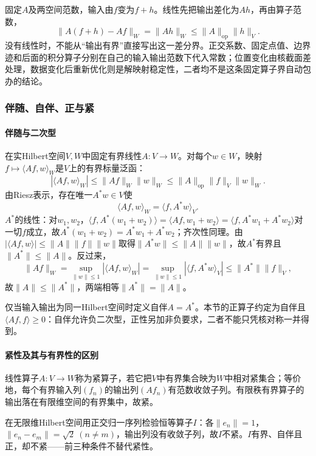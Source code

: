 固定$A$及两空间范数，输入由$f$变为$f+h$。线性先把输出差化为$Ah$，再由算子范数，
\begin{equation}
\label{eq:functional-operator-error-propagation}
\|A(f+h)-Af\|_W=\|Ah\|_W\le\|A\|_{\mathrm{op}}\|h\|_V.
\end{equation}
没有线性时，不能从“输出有界”直接写出这一差分界。正交系数、固定点值、边界迹和后面的积分算子分别在自己的输入输出范数下代入常数；位置变化由核截面差处理，数据变化后重新优化则是解映射稳定性，二者均不是这条固定算子界自动包办的结论。

\subsubsection{伴随、自伴、正与紧}
\label{subsubsec:adjoint-selfadjoint-compact}

\paragraph{伴随与二次型}

在实Hilbert空间$V,W$中固定有界线性$A:V\to W$。对每个$w\in W$，映射$f\mapsto\langle Af,w\rangle_W$是$V$上的有界标量泛函：
\[
|\langle Af,w\rangle_W|\le\|Af\|_W\|w\|_W\le\|A\|_{\mathrm{op}}\|f\|_V\|w\|_W.
\]
由Riesz表示，存在唯一$A^*w\in V$使
\[
\langle Af,w\rangle_W=\langle f,A^*w\rangle_V.
\]
$A^*$的线性：对$w_1,w_2$，$\langle f,A^*(w_1+w_2)\rangle=\langle Af,w_1+w_2\rangle=\langle f,A^*w_1+A^*w_2\rangle$对一切$f$成立，故$A^*(w_1+w_2)=A^*w_1+A^*w_2$；齐次性同理。由$|\langle Af,w\rangle|\le\|A\|\|f\|\|w\|$取得$\|A^*w\|\le\|A\|\|w\|$，故$A^*$有界且$\|A^*\|\le\|A\|$。反过来，
\[
\|Af\|_W=\sup_{\|w\|\le1}|\langle Af,w\rangle_W|
=\sup_{\|w\|\le1}|\langle f,A^*w\rangle_V|
\le\|A^*\|\|f\|_V,
\]
故$\|A\|\le\|A^*\|$，两端相等$\|A^*\|=\|A\|$。

仅当输入输出为同一Hilbert空间时定义自伴$A=A^*$。本节的正算子约定为自伴且$\langle Af,f\rangle\ge0$：自伴允许负二次型，正性另加非负要求，二者不能只凭核对称一并得到。

\paragraph{紧性及其与有界性的区别}

线性算子$A:V\to W$称为紧算子，若它把$V$中有界集合映为$W$中相对紧集合；等价地，每个有界输入列$(f_n)$的输出列$(Af_n)$有范数收敛子列。有限秩有界算子的输出落在有限维空间的有界集中，故紧。

在无限维Hilbert空间用正交归一序列检验恒等算子$I$：各$\|e_n\|=1$，$\|e_n-e_m\|=\sqrt2\ (n\ne m)$，输出列没有收敛子列，故$I$不紧。$I$有界、自伴且正，却不紧——前三种条件不替代紧性。

